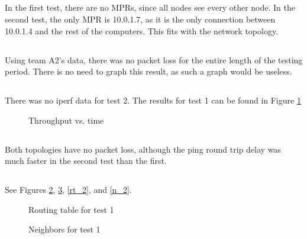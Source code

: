 \documentclass[11pt]{article}
\begin{document}
\subsection{}

In the first test, there are no MPRs, since all nodes see every other node. In the second test, the only MPR is 10.0.1.7, as it is the only connection between 10.0.1.4 and the rest of the computers. This fits with the network topology.

\subsection{}

Using team A2's data, there was no packet loss for the entire length of the testing period. There is no need to graph this result, as such a graph would be useless.

\subsection{}

There was no iperf data for test 2. The results for test 1 can be found in Figure \ref{throughput_graph}

\begin{figure}[hp]
	\caption{Throughput vs. time}
	\label{throughput_graph}
\end{figure}

\subsection{}

Both topologies have no packet loss, although the ping round trip delay was much faster in the second test than the first.

\subsection{}

See Figures \ref{rt_1}, \ref{n_1}, \ref{rt_2}, and \ref{n_2}.

\begin{figure}[hp]
	\caption{Routing table for test 1}
	\label{rt_1}
\end{figure}

\begin{figure}[hp]
	\caption{Neighbors for test 1}
	\label{n_1}
\end{figure}
\end{document}
